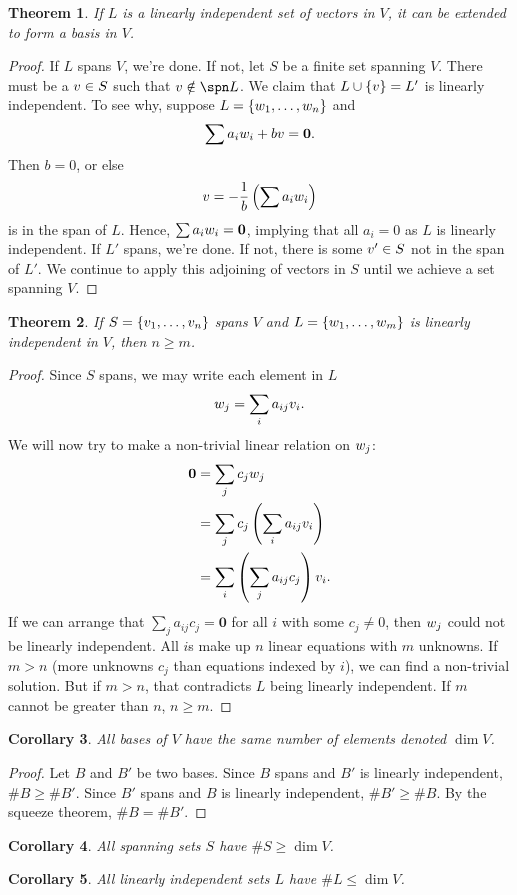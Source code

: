 \documentclass[11pt, oneside]{amsart}
\numberwithin{equation}{section}
\newtheorem{theorem}{Theorem}
\numberwithin{theorem}{section}
\newtheorem{corollary}[theorem]{Corollary}
\theoremstyle{definition}
\let\bf\relax
\def\0{\mathbf{0}}
\begin{document}
\begin{theorem}
If $L$ is a linearly independent set of vectors in $V$, it can be extended to form a basis in $V$.
\end{theorem}
\begin{proof}
If $L$ spans $V$, we're done. If not, let $S$ be a finite set spanning $V$. There must be a $\bf{v}\in S$ such that $\bf{v} \notin \spn L$. We claim that $L\cup \{\bf{v}\}=L'$ is linearly independent. To see why, suppose $L=\{\bf{w}_1,\hdots,\bf{w}_n\}$ and $$
\sum a_i\bf{w}_i + b\bf{v}=\0.
$$
Then $b=0$, or else $$\bf{v}=-\frac{1}{b}\left(\sum a_i\bf{w}_i \right)$$ is in the span of $L$. Hence, $\sum a_i\bf{w}_i=\0$, implying that all $a_i=0$ as $L$ is linearly independent. If $L'$ spans, we're done. If not, there is some $\bf{v}'\in S$ not in the span of $L'$. We continue to apply this adjoining of vectors in $S$ until we achieve a set spanning $V$.
\end{proof}

\begin{theorem}
If $S=\{\bf{v}_1,\hdots,\bf{v}_n\}$ spans $V$ and $L=\{\bf{w}_1,\hdots,\bf{w}_m\}$ is linearly independent in $V$, then $n\geqslant m$.
\end{theorem}
\begin{proof}
Since $S$ spans, we may write each element in $L$
$$
\bf{w}_j = \sum_i a_{ij}\bf{v}_i.
$$
We will now try to make a non-trivial linear relation on $\bf{w}_j$: 
$$
\begin{aligned}
\0&=\sum_j c_j\bf{w}_j\\
&= \sum_j c_j \left(\sum_i a_{ij}\bf{v}_i\right)\\
&= \sum_i\left(\sum_j a_{ij}c_j\right)\bf{v}_i.
\end{aligned}
$$
If we can arrange that $\sum_j a_{ij}c_j=\0$ for all $i$ with some $c_j\ne 0$, then $\bf{w}_j$ could not be linearly independent. All $i$s make up $n$ linear equations with $m$ unknowns. If $m>n$ (more unknowns $c_j$ than equations indexed by $i$), we can find a non-trivial solution. But if $m>n$, that contradicts $L$ being linearly independent. If $m$ cannot be greater than $n$, $n\geqslant m$.
\end{proof}

\begin{corollary}
All bases of $V$ have the same number of elements denoted $\dim V$.
\end{corollary}
\begin{proof}
Let $B$ and $B'$ be two bases. Since $B$ spans and $B'$ is linearly independent, $\#B\geqslant\# B'$. Since $B'$ spans and $B$ is linearly independent, $\#B'\geqslant\# B$. By the squeeze theorem, $\#B=\#B'$.
\end{proof}
\begin{corollary}
All spanning sets $S$ have $\#S\geqslant \dim V$.
\end{corollary}
\begin{corollary}
All linearly independent sets $L$ have $\#L\leqslant \dim V$.
\end{corollary}
\end{document}
